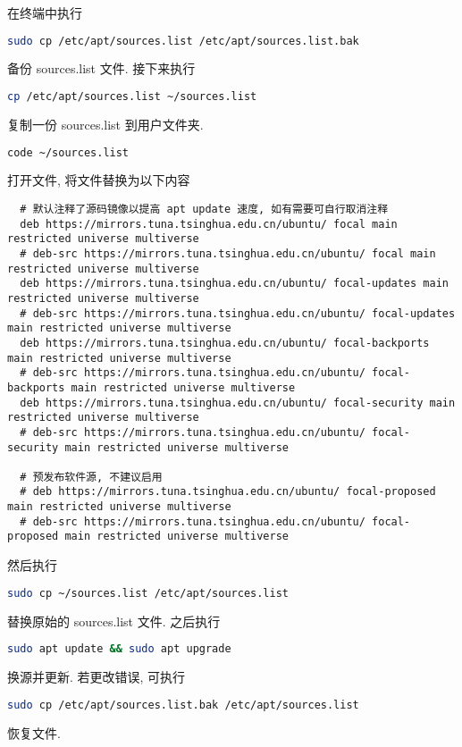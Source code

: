 \documentclass[fontset=founder]{ctexrep}
\begin{document}
在终端中执行
\begin{lstlisting}[language = bash]
  sudo cp /etc/apt/sources.list /etc/apt/sources.list.bak
\end{lstlisting}
备份 \textsf{sources.list} 文件.
接下来执行
\begin{lstlisting}[language = bash]
  cp /etc/apt/sources.list ~/sources.list
\end{lstlisting}
复制一份 \textsf{sources.list} 到用户文件夹.
\begin{lstlisting}[language = bash]
  code ~/sources.list
\end{lstlisting}
打开文件,
将文件替换为以下内容
\begin{lstlisting}
  # 默认注释了源码镜像以提高 apt update 速度, 如有需要可自行取消注释
  deb https://mirrors.tuna.tsinghua.edu.cn/ubuntu/ focal main restricted universe multiverse
  # deb-src https://mirrors.tuna.tsinghua.edu.cn/ubuntu/ focal main restricted universe multiverse
  deb https://mirrors.tuna.tsinghua.edu.cn/ubuntu/ focal-updates main restricted universe multiverse
  # deb-src https://mirrors.tuna.tsinghua.edu.cn/ubuntu/ focal-updates main restricted universe multiverse
  deb https://mirrors.tuna.tsinghua.edu.cn/ubuntu/ focal-backports main restricted universe multiverse
  # deb-src https://mirrors.tuna.tsinghua.edu.cn/ubuntu/ focal-backports main restricted universe multiverse
  deb https://mirrors.tuna.tsinghua.edu.cn/ubuntu/ focal-security main restricted universe multiverse
  # deb-src https://mirrors.tuna.tsinghua.edu.cn/ubuntu/ focal-security main restricted universe multiverse
  
  # 预发布软件源, 不建议启用
  # deb https://mirrors.tuna.tsinghua.edu.cn/ubuntu/ focal-proposed main restricted universe multiverse
  # deb-src https://mirrors.tuna.tsinghua.edu.cn/ubuntu/ focal-proposed main restricted universe multiverse
\end{lstlisting}
然后执行
\begin{lstlisting}[language = bash]
  sudo cp ~/sources.list /etc/apt/sources.list
\end{lstlisting}
替换原始的 \textsf{sources.list} 文件.
之后执行
\begin{lstlisting}[language=bash]
  sudo apt update && sudo apt upgrade
\end{lstlisting}
换源并更新.
若更改错误,
可执行
\begin{lstlisting}[language=bash]
  sudo cp /etc/apt/sources.list.bak /etc/apt/sources.list
\end{lstlisting}
恢复文件.
\end{document}
